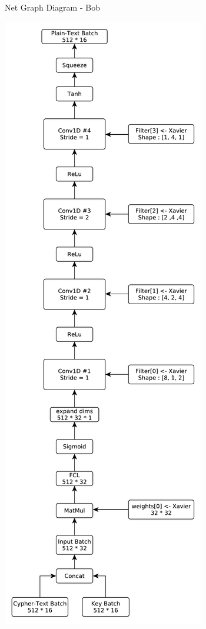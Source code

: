 \documentclass[a4paper, 12pt]{report}
\begin{document}
\newpage
\begin{blockfigure}{ Net Graph Diagram - Bob}
	\begin{center}
		\includegraphics[height=0.93\textheight]{Bob-Diagram}
	\end{center}
\end{blockfigure}
\end{document}
